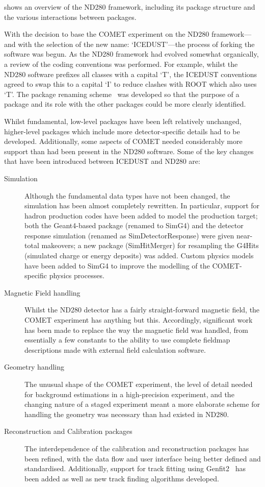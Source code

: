 \FigNDTwoEighty
{} shows an overview of the ND280 framework, including its package structure and the various interactions between packages.

With the decision to base the COMET experiment on the ND280 framework---and with the selection of the new name: `ICEDUST'---the process of forking the software was begun.
As the ND280 framework had evolved somewhat organically, a review of the coding conventions was performed.
For example, whilst the ND280 software prefixes all classes with a capital `T', the ICEDUST conventions~\cite{ID:conventions} agreed to swap this to a capital `I' to reduce clashes with ROOT which also uses `T'.
The package renaming scheme~\cite{ID:ForkingDocs} was developed so that the purpose of a package and its role with the other packages could be more clearly identified.

Whilst fundamental, low-level packages have been left relatively unchanged, higher-level packages which include more detector-specific details had to be developed.
Additionally, some aspects of COMET needed considerably more support than had been present in the ND280 software.
Some of the key changes that have been introduced between ICEDUST and ND280 are:
\begin{description}
	\item [Simulation] Although the fundamental data types have not been changed, the simulation has been almost completely rewritten.
		In particular, support for hadron production codes have been added to model the production target;
		both the Geant4-based package (renamed to SimG4) and the detector response simulation (renamed as SimDetectorResponse) were given near-total makeovers;
		a new package (SimHitMerger) for resampling the G4Hits (simulated charge or energy deposits) was added.
		Custom physics models have been added to SimG4 to improve the modelling of the COMET-specific physics processes.
	\item [Magnetic Field handling]  Whilst the ND280 detector has a fairly straight-forward magnetic field, the COMET experiment has anything but this.  
		Accordingly, significant work has been made to replace the way
		the magnetic field was handled, from essentially a few constants
		to the ability to use complete fieldmap descriptions made with
		external field calculation software.
	\item [Geometry handling] The unusual shape of the COMET experiment, the level of detail needed for background estimations in a high-precision experiment, and the changing nature of a staged experiment meant a more elaborate scheme for handling the geometry was necessary than had existed in ND280.
	\item [Reconstruction and Calibration packages] The interdependence of the calibration and reconstruction packages has been refined, with the data flow and user interface being better defined and standardised.
		Additionally, support for track fitting using Genfit2~\cite{genfit-Hoppner:2009af} has been added as well as new track finding algorithms developed.
\end{description}


